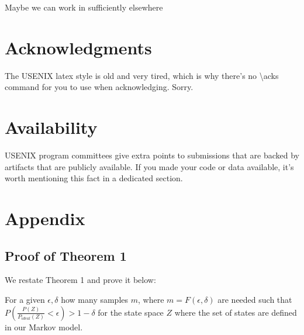 Maybe we can work in sufficiently elsewhere 

\section*{Acknowledgments}

The USENIX latex style is old and very tired, which is why
there's no \textbackslash{}acks command for you to use when
acknowledging. Sorry.

\section*{Availability}

USENIX program committees give extra points to submissions that are
backed by artifacts that are publicly available. If you made your code
or data available, it's worth mentioning this fact in a dedicated
section.

\section*{Appendix}
\subsection{Proof of Theorem 1}
We restate Theorem 1 and prove it below:

\begin{theorem}
\label{mainThm}
For a given $\epsilon, \delta$ how many samples $m$, where $m = F(\epsilon, \delta)$ are needed such that $P(\frac{P(Z)}{P_{ideal}(Z)}< \epsilon) > 1 - \delta$ for the state space $Z$ where the set of states are defined in our Markov model. 
\end{theorem}

